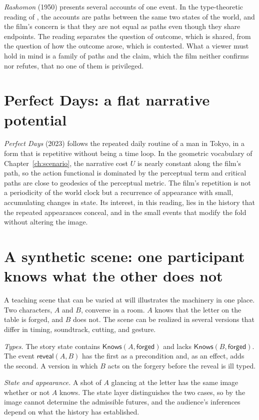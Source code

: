 \emph{Rashomon} (1950) presents several accounts of one event. In the type-theoretic reading of , the accounts are paths between the same two states of the world, and the film's concern is that they are not equal as paths even though they share endpoints. The reading separates the question of outcome, which is shared, from the question of how the outcome arose, which is contested. What a viewer must hold in mind is a family of paths and the claim, which the film neither confirms nor refutes, that no one of them is privileged.

\section{Perfect Days: a flat narrative potential}

\emph{Perfect Days} (2023) follows the repeated daily routine of a man in Tokyo, in a form that is repetitive without being a time loop. In the geometric vocabulary of Chapter~\ref{ch:scenario}, the narrative cost $U$ is nearly constant along the film's path, so the action functional is dominated by the perceptual term and critical paths are close to geodesics of the perceptual metric. The film's repetition is not a periodicity of the world clock but a recurrence of appearance with small, accumulating changes in state. Its interest, in this reading, lies in the history that the repeated appearances conceal, and in the small events that modify the fold without altering the image.

\section{A synthetic scene: one participant knows what the other does not}

A teaching scene that can be varied at will illustrates the machinery in one place. Two characters, $A$ and $B$, converse in a room. $A$ knows that the letter on the table is forged, and $B$ does not. The scene can be realized in several versions that differ in timing, soundtrack, cutting, and gesture.

\emph{Types.} The story state contains $\mathsf{Knows}(A,\mathsf{forged})$ and lacks $\mathsf{Knows}(B,\mathsf{forged})$. The event $\mathsf{reveal}(A,B)$ has the first as a precondition and, as an effect, adds the second. A version in which $B$ acts on the forgery before the reveal is ill typed.

\emph{State and appearance.} A shot of $A$ glancing at the letter has the same image whether or not $A$ knows. The state layer distinguishes the two cases, so by  the image cannot determine the admissible futures, and the audience's inferences depend on what the history has established.

